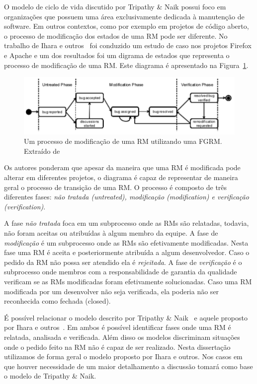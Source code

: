 O modelo de ciclo de vida discutido por Tripathy \& Naik possui foco em
organizações que possuem uma área exclusivamente dedicada à manutenção de
software. Em outros contextos, como por exemplo em projetos de código aberto, o
processo de modificação dos estados de uma RM pode ser diferente. No trabalho de
Ihara e outros~\cite{ihara2009analysis} foi conduzido um estudo de caso nos
projetos Firefox e Apache e um dos resultados foi um digrama de estados que
representa o processo de modificação de uma RM\@. Este diagrama é apresentado na
Figura~\ref{fig:diagrama-estado-rm-codigo-aberto}.

\begin{figure}[htpb]
	\centering
	\includegraphics[width=0.8\linewidth]{./chapter-manutencao-software-visao-geral/img/diagrama-estado-rm-codigo-aberto.pdf}
	\caption{Um processo de modificação de uma RM utilizando uma FGRM\@. Extraído
	de~\cite{ihara2009analysis}}
\label{fig:diagrama-estado-rm-codigo-aberto}
\end{figure}

Os autores ponderam que apesar da maneira que uma RM é modificada pode alterar
em diferentes projetos, o diagrama é capaz de representar de maneira geral o
processo de transição de uma RM\@. O processo é composto de três diferentes
fases: \textit{não tratada (untreated), modificação (modification) e verificação
    (verification)}.

A fase \textit{não tratada} foca em um subprocesso onde as RMs são relatadas,
todavia, não foram aceitas ou atribuídas à algum membro da equipe. A fase de
\textit{modificação} é um subprocesso onde as RMs são efetivamente modificadas.
Nesta fase uma RM é aceita e posteriormente atribuída a algum desenvolvedor.
Caso o pedido da RM não possa ser atendido ela é \textit{rejeitada}.  A fase de
\textit{verificação} é o subprocesso onde membros com a responsabilidade de
garantia da qualidade verificam se as RMs modificadas foram efetivamente
solucionadas. Caso uma RM modificada por um desenvolver não seja verificada, ela
poderia não ser reconhecida como fechada (closed).

É possível relacionar o modelo descrito por Tripathy \&
Naik~\cite{tripathy2014software} e aquele proposto por Ihara e
outros~\cite{ihara2009analysis}. Em ambos é possível identificar fases onde uma
RM é relatada, analisada e verificada. Além disso os modelos discriminam
situações onde o pedido feito na RM não é capaz de ser realizado. Nesta
dissertação utilizamos de forma geral o modelo proposto por Ihara e outros. Nos
casos em que houver necessidade de um maior detalhamento a discussão tomará como
base o modelo de Tripathy \& Naik.

